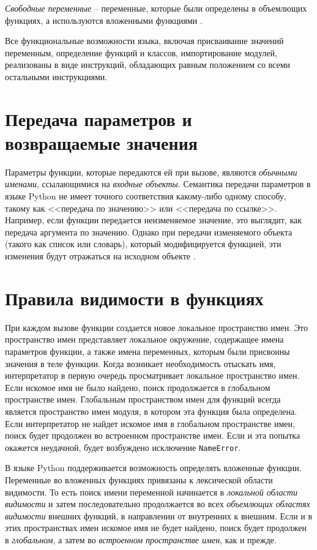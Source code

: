 \documentclass[%
	11pt,
	a4paper,
	utf8,
		]{article}
\begin{document}
\emph{Свободные переменные} -- переменные, которые были определены в объемлющих функциях, а используются вложенными функциями \cite[]{beazley:python-2010}.

Все функциональные возможности языка, включая присваивание значений переменным, определение функций и классов, импортирование модулей, реализованы в виде инструкций, обладающих равным положением со всеми остальными инструкциями.

\section{Передача параметров и возвращаемые значения}

Параметры функции, которые передаются ей при вызове, являются \emph{обычными именами}, ссылающимися на \emph{входные объекты}. Семантика передачи параметров в языке Python не имеет точного соответствия какому-либо одному способу, такому как <<передача по значению>> или <<передача по ссылке>>. Например, если функции передается неизменяемое значение, это выглядит, как передача аргумента по значению. Однако при передачи изменяемого объекта (такого как список или словарь), который модифицируется функцией, эти изменения будут отражаться на исходном объекте \cite[]{beazley:python-2010}.

\section{Правила видимости в функциях}

При каждом вызове функции создается новое локальное пространство имен. Это пространство имен представляет локальное окружение, содержащее имена параметров функции, а также имена переменных, которым были присвоины значения в теле функции. Когда возникает необходимость отыскать имя, интерпретатор в первую очередь просматривает локальное пространство имен. Если искомое имя не было найдено, поиск продолжается в глобальном пространстве имен. Глобальным пространством имен для функций всегда является пространство имен модуля, в котором эта функция была определена. Если интерпретатор не найдет искомое имя в глобальном пространстве имен, поиск будет продолжен во встроенном пространстве имен. Если и эта попытка окажется неудачной, будет возбуждено исключение \texttt{NameError}.

В языке Python поддерживается возможность определять вложенные функции. Переменные во вложенных функциях привязаны к лексической области видимости. То есть поиск имени переменной начинается в \emph{локальной области видимости} и затем последовательно продолжается во всех \emph{объемлющих областях видимости} внешних функций, в направлении от внутренних к внешним. Если и в этих пространствах имен искомое имя не будет найдено, поиск будет продолжен в \emph{глобальном}, а затем во \emph{встроенном пространстве имен}, как и прежде.
\end{document}
